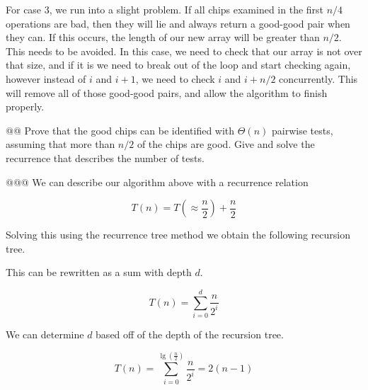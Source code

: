 \documentclass[10pt]{article}
\begin{document}
\begin{easylist}[enumerate]
    For case 3, we run into a slight problem. If all chips examined in the first $n/4$ operations are bad, then they will lie and always return a good-good pair when they can. If this occurs, the length of our new array will be greater than $n/2$. This needs to be avoided. In this case, we need to check that our array is not over that size, and if it is we need to break out of the loop and start checking again, however instead of $i$ and $i + 1$, we need to check $i$ and $i + n/2$ concurrently. This will remove all of those good-good pairs, and allow the algorithm to finish properly.\newline

    @@ Prove that the good chips can be identified with $\Theta(n)$ pairwise tests, assuming that more than $n/2$ of the chips are good. Give and solve the recurrence that describes the number of tests.

    @@@ We can describe our algorithm above with a recurrence relation

        \[ T(n) = T\left(\approx \frac{n}{2} \right) + \frac{n}{2} \]

        Solving this using the recurrence tree method we obtain the following recursion tree.

        \begin{figure}[!ht]
            \centering
        \end{figure}

        This can be rewritten as a sum with depth $d$.

        \[ T(n) = \sum^d_{i=0} \frac{n}{2^i} \]

        We can determine $d$ based off of the depth of the recursion tree.

        \[ T(n) = \sum^{\lg \left( \frac{n}{2} \right)}_{i=0} \frac{n}{2^i} = 2(n-1)\]


\end{easylist}
\end{document}
